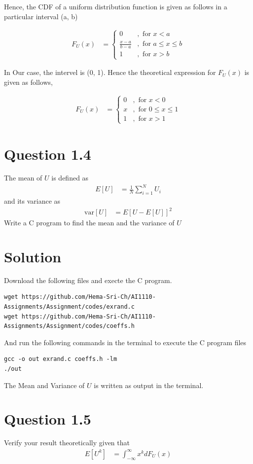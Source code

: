 \documentclass[16pt, a4paper, two column]{article}
\begin{document}
Hence, the CDF of a uniform distribution function is given as follows in a particular interval (a, b)

\begin{align}
	F_U(x) &= \begin{cases} 0 &, \text{ for } x < a\\
	 \frac{x-a}{b-a} &, \text{ for } a \leq x \leq b \\
	 1 &, \text{ for } x > b\end{cases}
\end{align}

In Our case, the intervel is (0, 1). Hence the theoretical expression for $F_U(x)$ is given as follows,

\begin{align}
	F_U(x) &= \begin{cases} 0 &, \text{ for } x < 0\\
	 x &, \text{ for } 0 \leq x \leq 1 \\
	 1 &, \text{ for } x > 1\end{cases}
\end{align}

\section*{Question 1.4}
The mean of $U$ is defined as 
\begin{align}
	E[U] &= \frac{1}{N}\sum_{i=1}^{N} U_i
\end{align}
and its variance as 
\begin{align}
	\text{var}[U] &= E[U-E[U]]^2
\end{align}
Write a C program to find the mean and the variance of $U$
\section*{Solution}
Download the following files and execte the C program.
\begin{lstlisting}
wget https://github.com/Hema-Sri-Ch/AI1110-Assignments/Assignment/codes/exrand.c
wget https://github.com/Hema-Sri-Ch/AI1110-Assignments/Assignment/codes/coeffs.h
\end{lstlisting}
And run the following commands in the terminal to execute the C program files
\begin{lstlisting}
gcc -o out exrand.c coeffs.h -lm
./out
\end{lstlisting}
The Mean and Variance of $U$ is written as output in the terminal.
\section*{Question 1.5}
Verify your result theoretically given that
\begin{align}
	E[U^k] &= \int_{-\infty}^{\infty}x^k dF_U(x)
\end{align}
\end{document}
